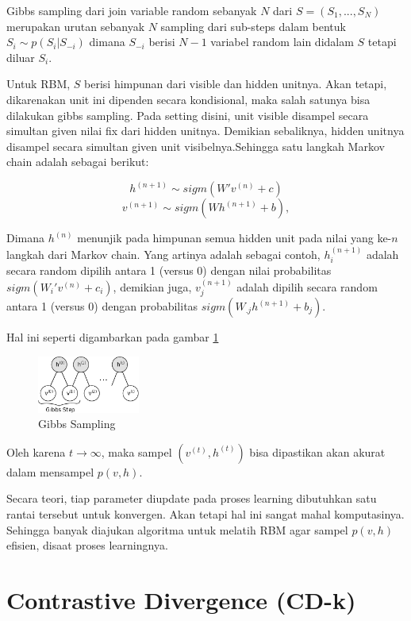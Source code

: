 Gibbs sampling dari join variable random sebanyak $N$ dari $S=(S_1, ... , S_N)$ merupakan urutan sebanyak $N$ sampling dari sub-steps dalam bentuk $S_i \sim p(S_i | S_{-i})$ dimana $S_{-i}$ berisi $N-1$ variabel random lain didalam $S$ tetapi diluar $S_i$.

Untuk RBM, $S$ berisi himpunan dari visible dan hidden unitnya. Akan tetapi, dikarenakan unit ini dipenden secara kondisional, maka salah satunya bisa dilakukan gibbs sampling. Pada setting disini, unit visible disampel secara simultan given nilai fix dari hidden unitnya. Demikian sebaliknya, hidden unitnya disampel secara simultan given unit visibelnya.Sehingga satu langkah Markov chain adalah sebagai berikut: 

\[h^{(n+1)} \sim sigm(W'v^{(n)} + c)\] 
\[v^{(n+1)} \sim sigm(W h^{(n+1)} + b),\]

Dimana $h^{(n)}$ menunjik pada himpunan semua hidden unit pada nilai yang ke-$n$ langkah dari Markov chain. Yang artinya adalah sebagai contoh, $h^{(n+1)}_i$ adalah secara random dipilih antara 1 (versus 0) dengan nilai probabilitas $sigm(W_i'v^{(n)} + c_i)$, demikian juga, $v^{(n+1)}_j$ adalah dipilih secara random antara 1 (versus 0) dengan probabilitas $sigm(W_{.j} h^{(n+1)} + b_j)$.

Hal ini seperti digambarkan pada gambar \ref{fig:markov_chain}
\begin{figure}
	\centering
	\includegraphics[width=0.3\textwidth]
		{pics/markov_chain.png}
	\caption{Gibbs Sampling}
	\label{fig:markov_chain}
\end{figure}


Oleh karena $t \rightarrow \infty$, maka sampel $(v^{(t)}, h^{(t)})$ bisa dipastikan akan akurat dalam mensampel $p(v,h)$.

Secara teori, tiap parameter diupdate pada proses learning dibutuhkan satu rantai tersebut untuk konvergen. Akan tetapi hal ini sangat mahal komputasinya. Sehingga banyak diajukan algoritma untuk melatih RBM agar sampel $p(v,h)$ efisien, disaat proses learningnya.

\section{Contrastive Divergence (CD-k)}

